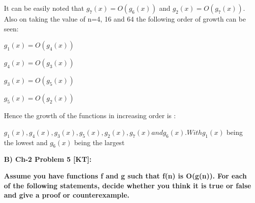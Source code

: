 \documentclass[letterpaper,portrait,12pt]{article}
\begin{document}
\begin{flushleft}
It can be easily noted that $g_7(x)=O(g_6(x))$ and $g_2(x)=O(g_7(x))$. Also on taking the value of n=4, 16 and 64 the following order of growth can be seen:
\end{flushleft}


\begin{flushleft}
$g_1(x)=O(g_4(x))$
\end{flushleft}


\begin{flushleft}
$g_4(x)=O(g_3(x))
$
\end{flushleft}


\begin{flushleft}
$g_3(x)=O(g_5(x))
$
\end{flushleft}


\begin{flushleft}
$g_5(x)=O(g_2(x))
$
\end{flushleft}


\begin{flushleft}
Hence the growth of the functions in increasing order is :
\end{flushleft}


\begin{flushleft}

\end{flushleft}


\begin{flushleft}
$g_1(x), g_4(x), g_3(x), g_5(x), g_2(x), g_7(x) and g_6(x). With g_1(x)$  being the lowest and $g_6(x) $ being the largest
\end{flushleft}


\begin{flushleft}

\end{flushleft}


\begin{flushleft}

\end{flushleft}


\begin{flushleft}
\textbf{B) Ch-2 Problem 5 [KT]: }
\end{flushleft}


\begin{flushleft}
\textbf{	Assume you have functions f and g such that f(n) is O(g(n)). For each of the following statements, decide whether you think it is true or false and give a proof or counterexample.}
\end{flushleft}
\end{document}
